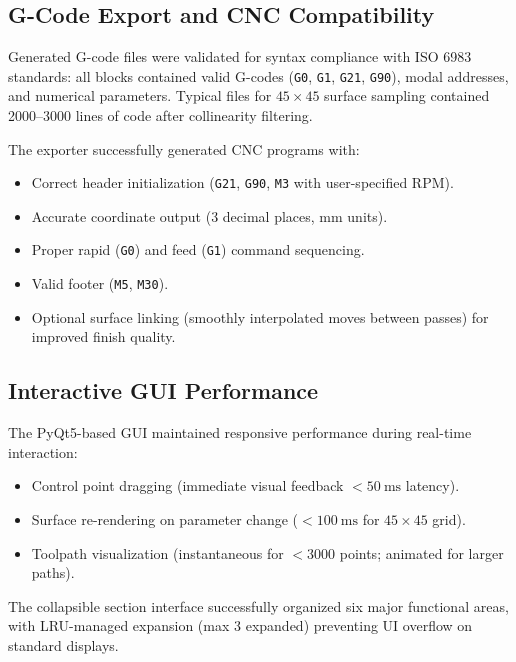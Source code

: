 \documentclass[a4paper,12pt]{article}
\begin{document}

\subsection{G-Code Export and CNC Compatibility}

Generated G-code files were validated for syntax compliance with ISO 6983
standards: all blocks contained valid G-codes (\texttt{G0}, \texttt{G1},
\texttt{G21}, \texttt{G90}), modal addresses, and numerical parameters. Typical
files for $45 \times 45$ surface sampling contained 2000--3000 lines of code
after collinearity filtering.

The exporter successfully generated CNC programs with:
\begin{itemize}
  \item Correct header initialization (\texttt{G21}, \texttt{G90}, \texttt{M3}
    with user-specified RPM).
  \item Accurate coordinate output (3 decimal places, mm units).
  \item Proper rapid (\texttt{G0}) and feed (\texttt{G1}) command sequencing.
  \item Valid footer (\texttt{M5}, \texttt{M30}).
  \item Optional surface linking (smoothly interpolated moves between passes)
    for improved finish quality.
\end{itemize}

\subsection{Interactive GUI Performance}

The PyQt5-based GUI maintained responsive performance during real-time
interaction:
\begin{itemize}
  \item Control point dragging (immediate visual feedback $< 50~\text{ms}$
    latency).
  \item Surface re-rendering on parameter change ($< 100~\text{ms}$ for
    $45 \times 45$ grid).
  \item Toolpath visualization (instantaneous for $< 3000$ points; animated
    for larger paths).
\end{itemize}

The collapsible section interface successfully organized six major functional
areas, with LRU-managed expansion (max 3 expanded) preventing UI overflow on
standard displays.
\end{document}
